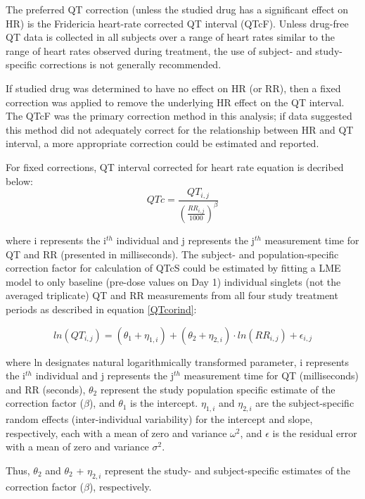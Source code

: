 \documentclass[
]{article}
\begin{document}
The preferred QT correction (unless the studied drug has a significant
effect on HR) is the Fridericia heart-rate corrected QT interval (QTcF).
Unless drug-free QT data is collected in all subjects over a range of
heart rates similar to the range of heart rates observed during
treatment, the use of subject- and study-specific corrections is not
generally recommended.

If studied drug was determined to have no effect on HR (or RR), then a
fixed correction was applied to remove the underlying HR effect on the
QT interval. The QTcF was the primary correction method in this
analysis; if data suggested this method did not adequately correct for
the relationship between HR and QT interval, a more appropriate
correction could be estimated and reported.

For fixed corrections, QT interval corrected for heart rate equation is
decribed below: \begin{equation} \label{QTcor}
QTc=\frac{QT_{i,j}}{\left(\frac{RR_{i,j}}{1000} \right)^\beta}
\end{equation}

where i represents the i\(^{th}\) individual and j represents the
j\(^{th}\) measurement time for QT and RR (presented in milliseconds).
The subject- and population-specific correction factor for calculation
of QTcS could be estimated by fitting a LME model to only baseline
(pre-dose values on Day 1) individual singlets (not the averaged
triplicate) QT and RR measurements from all four study treatment periods
as described in equation \ref{QTcorind}:

\begin{equation} \label{QTcorind}
ln(QT_{i,j}) = (\theta_1 + \eta_{1,i}) + (\theta_2 + \eta_{2,i}) \cdot ln(RR_{i,j}) + \epsilon_{i,j}
\end{equation}

where ln designates natural logarithmically transformed parameter, i
represents the i\(^{th}\) individual and j represents the j\(^{th}\)
measurement time for QT (milliseconds) and RR (seconds), \(\theta_2\)
represent the study population specific estimate of the correction
factor (\(\beta\)), and \(\theta_1\) is the intercept. \(\eta_{1,i}\)
and \(\eta_{2,i}\) are the subject-specific random effects
(inter-individual variability) for the intercept and slope,
respectively, each with a mean of zero and variance \(\omega^2\), and
\(\epsilon\) is the residual error with a mean of zero and variance
\(\sigma^2\).

Thus, \(\theta_2\) and \(\theta_2\) + \(\eta_{2,i}\) represent the
study- and subject-specific estimates of the correction factor
(\(\beta\)), respectively.
\end{document}

